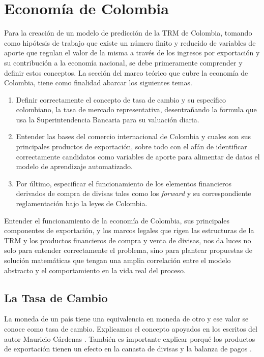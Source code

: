 \section{Economía de Colombia}
Para la creación de un modelo de predicción de la TRM de Colombia, tomando como hipótesis de trabajo que existe un número finito y reducido de variables de aporte que regulan el valor de la misma a través de los ingresos por exportación y su contribución a la economía nacional, se debe primeramente comprender y definir estos conceptos. La sección del marco teórico que cubre la economía de Colombia, tiene como finalidad abarcar los siguientes temas.

\begin{enumerate}
	\item Definir correctamente el concepto de tasa de cambio y su específico colombiano, la tasa de mercado representativa, desentrañando la formula que usa la Superintendencia Bancaria para su valuación diaria.
	\item Entender las bases del comercio internacional de Colombia y cuales son sus principales productos de exportación, sobre todo con el afán de identificar correctamente candidatos como variables de aporte para alimentar de datos el modelo de aprendizaje automatizado.
	\item Por último, especificar el funcionamiento de los elementos financieros derivados de compra de divisas tales como los \emph{forward} y su correspondiente reglamentación bajo la leyes de Colombia.
\end{enumerate}

Entender el funcionamiento de la economía de Colombia, sus principales componentes de exportación, y los marcos legales que rigen las estructuras de la TRM y los productos financieros de compra y venta de divisas, nos da luces no solo para entender correctamente el problema, sino para plantear propuestas de solución matemáticas que tengan una amplia correlación entre el modelo abstracto y el comportamiento en la vida real del proceso.

\subsection{La Tasa de Cambio}
La moneda de un país tiene una equivalencia en moneda de otro y ese valor se conoce como tasa de cambio. Explicamos el concepto apoyados en los escritos del autor Mauricio Cárdenas \cite{cardenas}. También es importante explicar porqué los productos de exportación tienen un efecto en la canasta de divisas y la balanza de pagos \cite{crisisCambiarias}.

